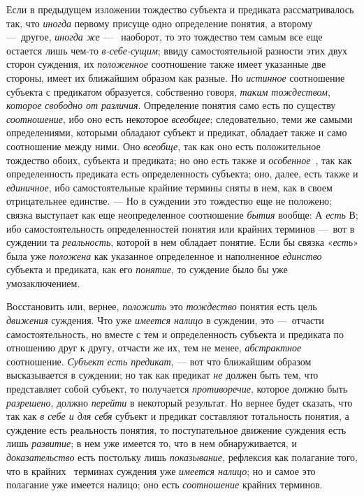 \documentclass[twoside]{article}
\begin{document}
{{{{Если в предыдущем изложении тождество субъекта и предиката
рассматривалось так, что {\em иногда}
первому присуще одно определение понятия, а второму
—~другое, {\em иногда же}
—~ наоборот, то это тождество тем самым все еще остается лишь
чем-то {\em в-себе-сущим};
ввиду самостоятельной разности этих двух сторон суждения, их
{\em положенное}
соотношение также имеет указанные две стороны, имеет их
ближайшим образом как разные. Но
{\em истинное}
соотношение субъекта с предикатом образуется, собственно
говоря, {\em таким тождеством},
{\em которое свободно от различия}.
Определение понятия само есть по существу
{\em соотношение}, ибо
оно есть некоторое {\em всеобщее};
следовательно, теми же самыми определениями, которыми
обладают субъект и предикат, обладает также и само соотношение между ними.
Оно {\em всеобще}, так
как оно есть положительное тождество обоих, субъекта и предиката; но оно
есть также и
{\em особенное}~\label{bkm:bm29},
так как определенность предиката есть определенность
субъекта; оно, далее, есть также и
{\em единичное}, ибо
самостоятельные крайние термины сняты в нем, как в своем отрицательнее
единстве. — Но в суждении это тождество еще не положено;
связка выступает как еще неопределенное соотношение
{\em бытия} вообще: А
{\em есть} В; ибо
самостоятельность определенностей понятия или крайних терминов
—~вот в суждении та
{\em реальность}, которой
в нем обладает понятие. Если бы связка
«{\em есть}» была уже
{\em положена} как
указанное определенное и наполненное
{\em единство} субъекта и
предиката, как его {\em понятие},
то суждение было бы уже умозаключением.

Восстановить или, вернее,
{\em положить} это
{\em тождество} понятия
есть цель {\em движения}
суждения. Что уже
{\em имеется налицо }в
суждении, это —~отчасти самостоятельность, но вместе с тем и
определенность субъекта и предиката по отношению друг к другу, отчасти же
их, тем не менее, {\em абстрактное}
соотношение. {\em Субъект
есть предикат}, — вот что ближайшим образом высказывается в
суждении; но так как предикат {\em не}
должен быть тем, что представляет собой субъект, то
получается {\em противоречие},
которое должно быть
{\em разрешено}, должно
{\em перейти} в некоторый
результат. Но вернее будет сказать, что так как
{\em в себе и для себя}
субъект и предикат составляют тотальность понятия, а суждение
есть реальность понятия, то поступательное движение суждения есть лишь
{\em развитие}; в нем уже
имеется то, что в нем обнаруживается, и
{\em доказательство} есть
постольку лишь {\em показывание},
рефлексия как полагание того, что в крайних
\ терминах суждения уже
{\em имеется налицо}; но
и самое это полагание уже имеется налицо; оно есть
{\em соотношение} крайних
терминов.

}}}}
\end{document}
